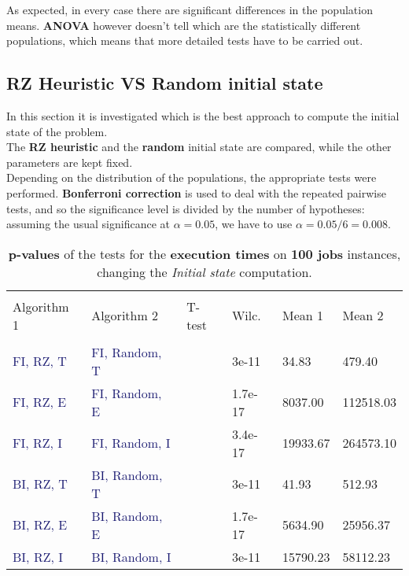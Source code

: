 \documentclass[
12pt,
a4paper,
oneside,
headinclude,
footinclude]{article}
\theoremstyle{definition} %
\begin{document}
As expected, in every case there are significant differences in the population means. \textbf{ANOVA} however doesn't tell which are the statistically different populations, which means that more detailed tests have to be carried out.

\subsection{RZ Heuristic VS Random initial state}
In this section it is investigated which is the best approach to compute the initial state of the problem.\\
The \textbf{RZ heuristic} and the \textbf{random} initial state are compared, while the other parameters are kept fixed. \\
Depending on the distribution of the populations, the appropriate tests were performed. \textbf{Bonferroni correction} is used to deal with the repeated pairwise tests, and so the significance level is divided by the number of hypotheses: assuming the usual significance at $\alpha = 0.05$, we have to use $\alpha = 0.05 / 6 = 0.008$.

\begin{table}[H]
    \begin{tabular}{l l l l l l} %
        \hline
        \hline 
        \\[-1.5ex]
        \textcolor{BrickRed}{Algorithm 1} & \textcolor{BrickRed}{Algorithm 2} & \textcolor{BrickRed}{T-test} & \textcolor{BrickRed}{Wilc.} & \textcolor{BrickRed}{Mean 1} & \textcolor{BrickRed}{Mean 2}\\ [0.5ex]
        \hline %
        \\[-1.5ex]
        \textcolor{MidnightBlue}{FI, RZ, T} & \textcolor{MidnightBlue}{FI, Random, T} &  & 3e-11  & 34.83 & 479.40 \\ 
        \textcolor{MidnightBlue}{FI, RZ, E} & \textcolor{MidnightBlue}{FI, Random, E} &  & 1.7e-17 & 8037.00 & 112518.03 \\ 
        \textcolor{MidnightBlue}{FI, RZ, I} & \textcolor{MidnightBlue}{FI, Random, I} &  & 3.4e-17 & 19933.67 & 264573.10 \\ 
        \textcolor{MidnightBlue}{BI, RZ, T} & \textcolor{MidnightBlue}{BI, Random, T} &  & 3e-11 & 41.93 & 512.93 \\ 
        \textcolor{MidnightBlue}{BI, RZ, E} & \textcolor{MidnightBlue}{BI, Random, E} &  & 1.7e-17 & 5634.90 & 25956.37 \\ 
        \textcolor{MidnightBlue}{BI, RZ, I} & \textcolor{MidnightBlue}{BI, Random, I} &  & 3e-11 & 15790.23 & 58112.23 \\ 
        [1ex] %
        \hline %
    \end{tabular}
    \caption{\label{tab:ii-initialstate100exec}\textbf{p-values} of the tests for the \textbf{execution times} on \textbf{100 jobs} instances, changing the \textit{Initial state} computation.}
\end{table} 
\end{document}
